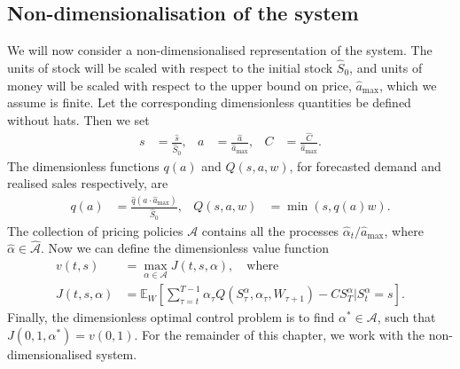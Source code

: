 \documentclass[main.tex]{subfiles}
\begin{document}
\subsection{Non-dimensionalisation of the system}
We will now consider a non-dimensionalised
representation of the system.
The units of stock will be  scaled with
respect to
the initial stock $\hat{S}_0$, and units of money will be scaled with respect to
the upper bound on
price, $\hat{a}_{\mathrm{max}}$, which we assume is finite.
Let the corresponding dimensionless quantities be defined without hats.
Then we set
\begin{align}
  s
  &= \frac{\hat{s}}{\hat{S}_0},
  & a
  &=\frac{\hat{a}}{\hat{a}_{\mathrm{max}}},
  &C&=\frac{\hat{C}}{\hat{a}_{\mathrm{max}}}.%
\end{align}
The dimensionless functions $q(a)$ and $Q(s,a,w)$,
for forecasted demand
and realised sales respectively, are
\begin{align}
  q(a)&= \frac{\hat{q}(a\cdot \hat{a}_{\max})}{\hat{S}_0},
  &Q(s,a, w)&= \min(s, q(a) w).
\end{align}
The collection of pricing policies $\mathcal{A}$ contains all
the processes $\hat{\alpha}_t/\hat{a}_{\mathrm{max}}$, where
$\hat{\alpha}\in \hat{\mathcal{A}}$.
Now we can define the dimensionless value function
\begin{align}\label{eq:value_function_def_nondim}
  v(t,s)&=\max_{\alpha\in\mathcal{A}}
          J(t,s,\alpha),\quad\text{where}\\
  J(t,s,\alpha)&=
                 \mathbb{E}_{W}\left[ \sum_{\tau=t}^{T-1}
                 \alpha_\tau Q(
                 {S}_\tau^\alpha,\alpha_\tau,
                 W_{\tau+1})
                 - C S_{T}^\alpha \big\vert S_{t}^\alpha =
                 s
                 \right].
                 \label{eq:value_function_def_nondim2}
\end{align}
Finally, the dimensionless optimal control problem
is to find $\alpha^*\in{\mathcal A}$, such that
$J(0,1,\alpha^*)=v(0,1)$.
For the remainder of this chapter, we work with the
non-dimensionalised system.%
\end{document}
